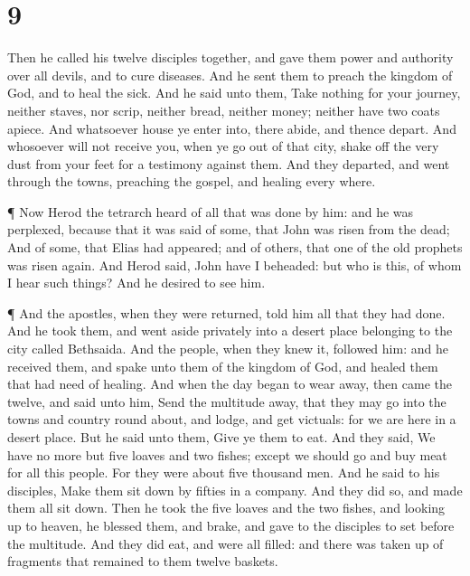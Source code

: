 \hypertarget{section-8}{%
\section{9}\label{section-8}}

 Then he called his twelve disciples together, and gave them
power and authority over all devils, and to cure diseases. 
And he sent them to preach the kingdom of God, and to heal the sick.
 And he said unto them, Take nothing for your journey,
neither staves, nor scrip, neither bread, neither money; neither have
two coats apiece.  And whatsoever house ye enter into, there
abide, and thence depart.  And whosoever will not receive
you, when ye go out of that city, shake off the very dust from your feet
for a testimony against them.  And they departed, and went
through the towns, preaching the gospel, and healing every where.

 ¶ Now Herod the tetrarch heard of all that was done by him:
and he was perplexed, because that it was said of some, that John was
risen from the dead;  And of some, that Elias had appeared;
and of others, that one of the old prophets was risen again.
 And Herod said, John have I beheaded: but who is this, of
whom I hear such things? And he desired to see him.

 ¶ And the apostles, when they were returned, told him all
that they had done. And he took them, and went aside privately into a
desert place belonging to the city called Bethsaida.  And
the people, when they knew it, followed him: and he received them, and
spake unto them of the kingdom of God, and healed them that had need of
healing.  And when the day began to wear away, then came
the twelve, and said unto him, Send the multitude away, that they may go
into the towns and country round about, and lodge, and get victuals: for
we are here in a desert place.  But he said unto them, Give
ye them to eat. And they said, We have no more but five loaves and two
fishes; except we should go and buy meat for all this people.
 For they were about five thousand men. And he said to his
disciples, Make them sit down by fifties in a company.  And
they did so, and made them all sit down.  Then he took the
five loaves and the two fishes, and looking up to heaven, he blessed
them, and brake, and gave to the disciples to set before the multitude.
 And they did eat, and were all filled: and there was taken
up of fragments that remained to them twelve baskets.


